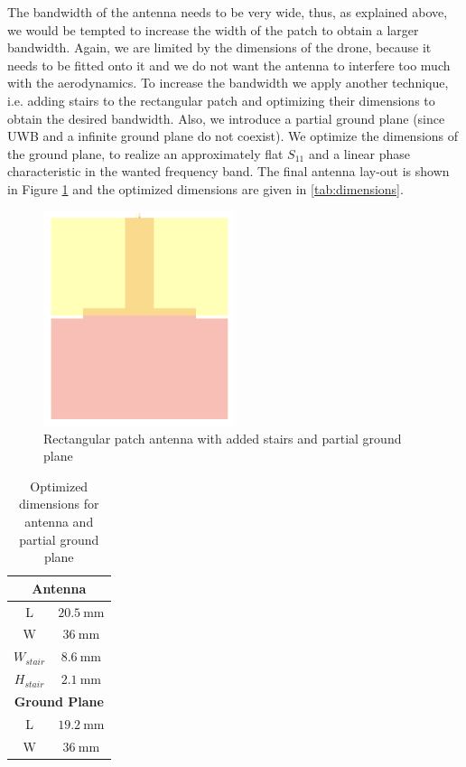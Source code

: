 \documentclass[a4paper]{article}        %
\begin{document}
  The bandwidth of the antenna needs to be very wide, thus, as explained above, we would be tempted to increase the width of the patch to obtain a larger bandwidth. Again, we are limited by the dimensions of the drone, because it needs to be fitted onto it and we do not want the antenna to interfere too much with the aerodynamics. To increase the bandwidth we apply another technique, i.e. adding stairs to the rectangular patch and optimizing their dimensions to obtain the desired bandwidth. Also, we introduce a partial ground plane (since UWB and a infinite ground plane do not coexist). We optimize the dimensions of the ground plane, to realize an approximately flat $S_{11}$ and a linear phase characteristic in the wanted frequency band. The final antenna lay-out is shown in Figure \ref{fig:patch_stairs} and the optimized dimensions are given in \autoref{tab:dimensions}.

	\begin{figure}[H]
	\centering
		\includegraphics[width=0.5\textwidth]{images/antenna/patch_stairs.png}
		\caption{Rectangular patch antenna with added stairs and partial ground plane}
		\label{fig:patch_stairs}
	\end{figure}

	\begin{table}[H]
	\centering
	\begin{tabular}{|c|c|}
		\hline
		\multicolumn{2}{|c|}{\textbf{Antenna}} \\ \hline
		L & $\SI{20.5}{\milli\meter}$ \\ \hline
		W & $\SI{36}{\milli\meter}$ \\ \hline
		$W_{stair}$ & $\SI{8.6}{\milli\meter}$ \\ \hline
		$H_{stair}$ & $\SI{2.1}{\milli\meter}$ \\ \hline
		\multicolumn{2}{|c|}{\textbf{Ground Plane}} \\ \hline
		L & $\SI{19.2}{\milli\meter}$ \\ \hline
		W & $\SI{36}{\milli\meter}$ \\ \hline 
	\end{tabular}
	\caption{Optimized dimensions for antenna and partial ground plane}
	\label{tab:dimensions}
	\end{table}
\end{document}
